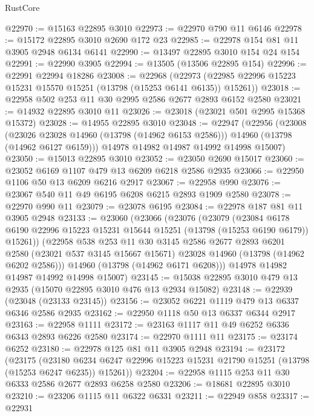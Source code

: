 \begin{lexlean}{RustCore}
\begin{coremodule}
@22970 := @15163 @22895 @3010
@22973 := @22970 @790 @11 @6146
@22978 := @15172 @22895 @3010 @2690 @172 @23
@22985 := @22978 @154 @81 @11 @3905 @2948 @6134 @6141
@22990 := @13497 @22895 @3010 @154 @24 @154
@22991 := @22990 @3905
@22994 := @13505 (@13506 @22895 @154)
@22996 := @22991 @22994 @18286
@23008 := @22968
    (@22973 (@22985 @22996 @15223 @15231 @15570 @15251 (@13798 (@15253 @6141 @6135)) @15261))
@23018 := @22958 @502 @253 @11 @30 @2995 @2586 @2677 @2893 @6152 @2580
@23021 := @14932 @22895 @3010 @11
@23026 := @23018 (@23021 @501 @2995 @15368 @15372)
@23028 := @14955 @22895 @3010
@23048 := @22947
    (@22956
      (@23008
        (@23026 @23028 @14960 (@13798 (@14962 @6153 @2586)))
        @14960
        (@13798 (@14962 @6127 @6159)))
      @14978
      @14982
      @14987
      @14992
      @14998
      @15007)
@23050 := @15013 @22895 @3010
@23052 := @23050 @2690 @15017
@23060 := @23052 @6169 @1107 @479 @13 @6209 @6218 @2586 @2935
@23066 := @22950 @1106 @50 @13 @6209 @6216 @2917
@23067 := @22958 @990
@23076 := @23067 @540 @11 @49 @6195 @6208 @6215 @2893 @1909 @2580
@23078 := @22970 @990 @11
@23079 := @23078 @6195
@23084 := @22978 @187 @81 @11 @3905 @2948
@23133 := @23060
    (@23066
      (@23076
        (@23079
          (@23084
            @6178
            @6190
            @22996
            @15223
            @15231
            @15644
            @15251
            (@13798 (@15253 @6190 @6179))
            @15261))
        (@22958
          @538
          @253
          @11
          @30
          @3145
          @2586
          @2677
          @2893
          @6201
          @2580
          (@23021 @537 @3145 @15667 @15671)
          @23028
          @14960
          (@13798 (@14962 @6202 @2586)))
        @14960
        (@13798 (@14962 @6171 @6208)))
      @14978
      @14982
      @14987
      @14992
      @14998
      @15007)
@23145 := @15038 @22895 @3010 @479 @13 @2935 (@15070 @22895 @3010 @476 @13 @2934 @15082)
@23148 := @22939 (@23048 (@23133 @23145))
@23156 := @23052 @6221 @1119 @479 @13 @6337 @6346 @2586 @2935
@23162 := @22950 @1118 @50 @13 @6337 @6344 @2917
@23163 := @22958 @1111
@23172 := @23163 @1117 @11 @49 @6252 @6336 @6343 @2893 @6226 @2580
@23174 := @22970 @1111 @11
@23175 := @23174 @6252
@23180 := @22978 @125 @81 @11 @3905 @2948
@23194 := @23172
    (@23175
      (@23180 @6234 @6247 @22996 @15223 @15231 @21790 @15251 (@13798 (@15253 @6247 @6235)) @15261))
@23204 := @22958 @1115 @253 @11 @30 @6333 @2586 @2677 @2893 @6258 @2580
@23206 := @18681 @22895 @3010
@23210 := @23206 @1115 @11 @6322 @6331
@23211 := @22949 @858
@23317 := @22931

\end{coremodule}
\end{lexlean}
